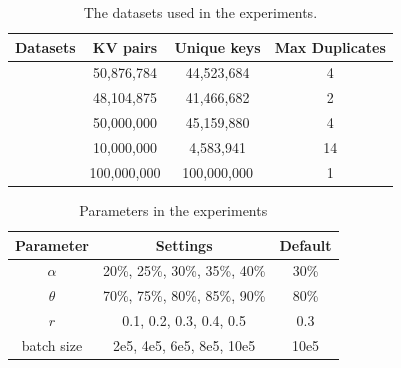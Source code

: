
\begin{table}[t]
	\caption{The datasets used in the experiments.}
	\vspace{-1.5em}
	\label{table:exp_data_sets}
	\centering
	\begin{tabular}{|c|c|c|c|}
		\hline
		Datasets & KV pairs & Unique keys & Max Duplicates \\ \hline
		\dstwitter &50,876,784 & 44,523,684&4\\ \hline
		\dsreddit & 48,104,875 & 41,466,682 &2 \\ \hline
		\dstpch &50,000,000 & 45,159,880&4\\ \hline
		\dsali &10,000,000 & 4,583,941&14\\ \hline
		\dsrandom & 100,000,000& 100,000,000& 1 \\ \hline
	\end{tabular}
\end{table}

\begin{table}[t]
	\centering
	\caption{Parameters in the experiments}
	\vspace{-1.5em}
	\label{tbl:parameters}
	\begin{tabular}{|c|c|c|}
		\hline
		\textbf{Parameter} & \textbf{Settings} & \textbf{Default} \\ \hline
		$\alpha$ & 20\%, 25\%, 30\%, 35\%, 40\% & 30\% \\ \hline
		$\theta$  & 70\%, 75\%, 80\%, 85\%, 90\% & 80\% \\ \hline
		$r$ & 0.1, 0.2, 0.3, 0.4, 0.5 & 0.3 \\ \hline
		batch size & 2e5, 4e5, 6e5, 8e5, 10e5 & 10e5 \\ \hline
	\end{tabular}
\end{table}

